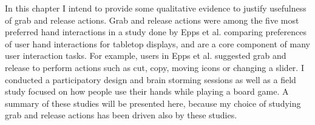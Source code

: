 \label{chapter:introduction}

In this chapter I intend to provide some qualitative evidence to justify usefulness of grab and release actions.  
Grab and release actions were among the five most preferred hand interactions in a study done by Epps et al.\cite{Epps:2006:SHSUTGI} comparing preferences of user hand interactions for tabletop displays, and are a core component of many user interaction tasks. 
For example, users in Epps et al. suggested grab and release to perform actions such as cut, copy, moving icons or changing a slider.
I conducted a participatory design and brain storming sessions as well as a field study focused on how people use their hands while playing a board game. 
A summary of these studies will be presented here, because my choice of studying grab and release actions has been driven also by these studies.

